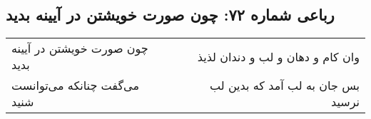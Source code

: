 \begin{center}
\section*{رباعی شماره ۷۲: چون صورت خویشتن در آیینه بدید}
\label{sec:072}
\begin{longtable}{l p{0.5cm} r}
چون صورت خویشتن در آیینه بدید
&&
وان کام و دهان و لب و دندان لذیذ
\\
می‌گفت چنانکه می‌توانست شنید
&&
بس جان به لب آمد که بدین لب نرسید
\\
\end{longtable}
\end{center}
